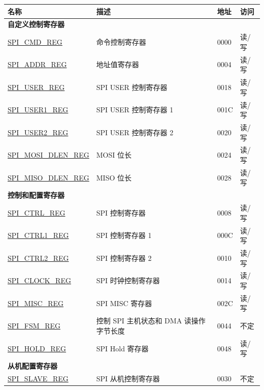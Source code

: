 \begin{longtable}{ | p{6cm} | p{7.2cm} | p{1.3cm} | p{1cm} | }
\hline\rowcolor{lightgray}
名称 & 描述 & 地址 & 访问 \\ \hline
\endhead
\multicolumn{4}{|l|}{\textbf{自定义控制寄存器}} \\ \hline
\hyperref[regdesc:SPICMDREG]{SPI\_CMD\_REG} & 命令控制寄存器 & \hexprefix{}0000 &读/写 \\ \hline
\hyperref[regdesc:SPIADDRREG]{SPI\_ADDR\_REG} & 地址值寄存器 & \hexprefix{}0004 &读/写 \\ \hline
\hyperref[regdesc:SPIUSERREG]{SPI\_USER\_REG} & SPI USER 控制寄存器 & \hexprefix{}0018 &读/写 \\ \hline
\hyperref[regdesc:SPIUSER1REG]{SPI\_USER1\_REG} & SPI USER 控制寄存器 1 & \hexprefix{}001C &读/写 \\ \hline
\hyperref[regdesc:SPIUSER2REG]{SPI\_USER2\_REG} & SPI USER 控制寄存器 2 & \hexprefix{}0020 &读/写 \\ \hline
\hyperref[regdesc:SPIMOSIDLENREG]{SPI\_MOSI\_DLEN\_REG} & MOSI 位长 & \hexprefix{}0024 &读/写 \\ \hline
\hyperref[regdesc:SPIMISODLENREG]{SPI\_MISO\_DLEN\_REG} & MISO 位长 & \hexprefix{}0028 &读/写 \\ \hline
\multicolumn{4}{|l|}{\textbf{控制和配置寄存器}} \\ \hline
\hyperref[regdesc:SPICTRLREG]{SPI\_CTRL\_REG} & SPI 控制寄存器 & \hexprefix{}0008 &读/写 \\ \hline
\hyperref[regdesc:SPICTRL1REG]{SPI\_CTRL1\_REG} & SPI 控制寄存器 1 & \hexprefix{}000C &读/写 \\ \hline
\hyperref[regdesc:SPICTRL2REG]{SPI\_CTRL2\_REG} & SPI 控制寄存器 2 & \hexprefix{}0010 &读/写 \\ \hline
\hyperref[regdesc:SPICLOCKREG]{SPI\_CLOCK\_REG} & SPI 时钟控制寄存器 & \hexprefix{}0014 &读/写 \\ \hline
\hyperref[regdesc:SPIMISCREG]{SPI\_MISC\_REG} & SPI MISC 寄存器 & \hexprefix{}002C &读/写 \\ \hline
\hyperref[regdesc:SPIFSMREG]{SPI\_FSM\_REG} & 控制 SPI 主机状态和 DMA 读操作字节长度 & \hexprefix{}0044 & 不定 \\ \hline
\hyperref[regdesc:SPIHOLDREG]{SPI\_HOLD\_REG} & SPI Hold 寄存器 & \hexprefix{}0048 &读/写 \\ \hline
\multicolumn{4}{|l|}{\textbf{从机配置寄存器}} \\ \hline
\hyperref[regdesc:SPISLAVEREG]{SPI\_SLAVE\_REG} & SPI 从机控制寄存器 & \hexprefix{}0030 & 不定 \\ \hline

\end{longtable}
